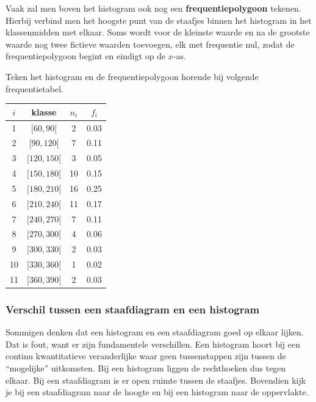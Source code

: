 \documentclass[12pt,twoside]{article}
\begin{document}
Vaak zal men boven het histogram ook nog een {\bf frequentiepolygoon} tekenen. Hierbij verbind men het hoogste punt van de staafjes binnen het histogram in het klassenmidden met elkaar. Soms wordt voor de kleinste waarde en na de grootste waarde nog twee fictieve waarden toevoegen, elk met frequentie nul, zodat de frequentiepolygoon begint en eindigt op de $x$-as.

\begin{oefening}
Teken het histogram en de frequentiepolygoon horende bij volgende frequentietabel.\\
\begin{minipage}{0.5\textwidth}
\begin{center}
\begin{tabular}{c|c|c|c}
$i$ & klasse     & $n_i$ & $f_i$\\
\hline
  1 & $[ 60,  90[$ &   2 &  0.03\\
  2 & $[ 90, 120[$ &   7 &  0.11\\
  3 & $[120, 150[$ &   3 &  0.05\\
  4 & $[150, 180[$ &  10 &  0.15\\
  5 & $[180, 210[$ &  16 &  0.25\\
  6 & $[210, 240[$ &  11 &  0.17\\
  7 & $[240, 270[$ &   7 &  0.11\\
  8 & $[270, 300[$ &   4 &  0.06\\
  9 & $[300, 330[$ &   2 &  0.03\\
 10 & $[330, 360[$ &   1 &  0.02\\
 11 & $[360, 390[$ &   2 &  0.03\\
\end{tabular}
\end{center}
\end{minipage}
\begin{minipage}{0.6\textwidth}
\begin{center}
\end{center}
\end{minipage}
\end{oefening}


\subsubsection*{Verschil tussen een staafdiagram en een histogram}
Sommigen denken dat een histogram en een staafdiagram goed op elkaar
lijken. Dat is fout, want er zijn fundamentele verschillen. Een histogram hoort
bij een continu kwantitatieve veranderlijke waar geen tussenstappen zijn tussen
de “mogelijke” uitkomsten. Bij een histogram liggen de rechthoeken dus tegen
elkaar. Bij een staafdiagram is er open ruimte tussen de staafjes. Bovendien
kijk je bij een staafdiagram naar de hoogte en bij een histogram naar de
oppervlakte.
\end{document}
